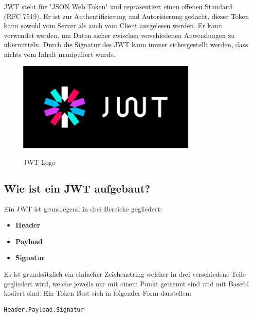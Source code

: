 JWT steht für "JSON Web Token" und repräsentiert einen offenen Standard (RFC 7519). Er ist zur Authentifizierung und Autorisierung gedacht, dieser Token kann sowohl vom Server als auch vom Client ausgelesen werden. Er kann verwendet werden, um Daten sicher zwischen verschiedenen Anwendungen zu übermitteln. Durch die Signatur des JWT kann immer sichergestellt werden, dass nichts vom Inhalt manipuliert wurde. \cite{JWT_1}

\begin{figure}[h]
    \centering
    \includegraphics[width=0.8\textwidth]{pics/jwt-logo.png}
    \caption{JWT Logo}
    \cite{jwt_grafik}
\end{figure}


\subsection{Wie ist ein JWT aufgebaut?}
Ein JWT ist grundlegend in drei Bereiche gegliedert:

\begin{itemize}
\item \textbf{Header}
\item \textbf{Payload}
\item \textbf{Signatur}
\end{itemize}

Es ist grundsätzlich ein einfacher Zeichenstring welcher in drei verschiedene Teile gegliedert wird, welche jeweils nur mit einem Punkt getrennt sind und mit Base64 kodiert sind. Ein Token lässt sich in folgender Form darstellen:

\begin{lstlisting}
Header.Payload.Signatur
\end{lstlisting}


